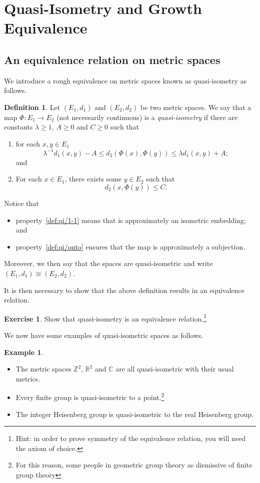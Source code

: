 \documentclass[11pt,a4paper,reqno]{amsart}
\theoremstyle{plain}
\theoremstyle{definition}
\newtheorem{definition}[theorem]{Definition}
\theoremstyle{definition}
\newtheorem{exercise}[theorem]{Exercise}
\newtheorem{example}[theorem]{Example}
\renewcommand\leq\leqslant
\renewcommand\geq\geqslant
\begin{document}
\section{Quasi-Isometry and Growth Equivalence}

\subsection{An equivalence relation on metric spaces}

We introduce a rough equivalence on metric spaces known as quasi-isometry as follows.

\begin{definition}
	Let $(E_1,d_1)$ and $(E_2,d_2)$ be two metric spaces.	
	We say that a map $\Phi\colon E_1 \to E_2$ (not necessarily continuous) is a \emph{quasi-isometry} if there are constants $\lambda\geq 1$, $A\geq 0$ and $C\geq 0$ such that
	\begin{enumerate}
		\item\label{def:qi/1-1}
		for each $x,y\in E_1$
		\[
			\lambda^{-1} d_1(x,y) - A
			\leq
			d_2(\Phi(x),\Phi(y))
			\leq
			\lambda d_1(x,y) + A;
		\]
		and
		\item\label{def:qi/onto}
		For each $x\in E_1$, there exists some $y\in E_2$ such that
		\[
		d_2(x,\Phi(y)) \leq C.
		\]
	\end{enumerate}
	Notice that
	\begin{itemize}
		\item property~\ref{def:qi/1-1} means that is approximately an isometric embedding; and
		\item property~\ref{def:qi/onto} ensures that the map is approximately a subjection.
	\end{itemize}
	Moreover, we then say that the spaces are quasi-isometric and write $(E_1,d_1) \cong (E_2,d_2)$.
\end{definition}

It is then necessary to show that the above definition results in an equivalence relation.

\begin{exercise}\label{ex:qi-isequiv}
	Show that quasi-isometry is an equivalence relation.\footnote{Hint: in order to prove symmetry of the equivalence relation, you will need the axiom of choice.}
\end{exercise}

We now have some examples of quasi-isometric spaces as follows.

\begin{example} ~
	
	\begin{itemize}
		\item The metric spaces $\mathbb{Z}^2$, $\mathbb{R}^2$ and $\mathbb{C}$ are all quasi-isometric with their usual metrics.
		\item Every finite group is quasi-isometric to a point.\footnote{For this reason, some people in geometric group theory as dismissive of finite group theory}
		\item The integer Heisenberg group is quasi-isometric to the real Heisenberg group.
	\end{itemize}
\end{example}
\end{document}
